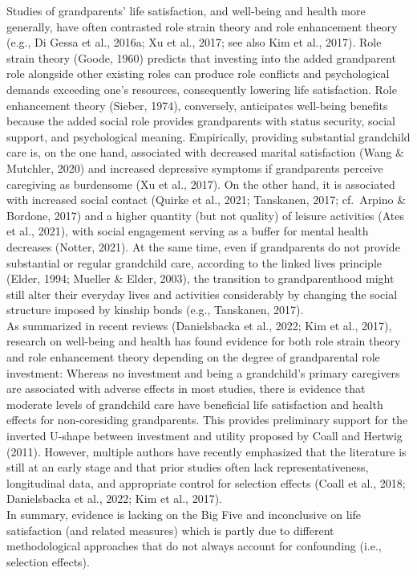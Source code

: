 \documentclass[
  english,
  man,floatsintext]{apa7}
\begin{document}
Studies of grandparents' life satisfaction, and well-being and health more generally, have often contrasted role strain theory and role enhancement theory (e.g., Di Gessa et al., 2016a; Xu et al., 2017; see also Kim et al., 2017). Role strain theory (Goode, 1960) predicts that investing into the added grandparent role alongside other existing roles can produce role conflicts and psychological demands exceeding one's resources, consequently lowering life satisfaction. Role enhancement theory (Sieber, 1974), conversely, anticipates well-being benefits because the added social role provides grandparents with status security, social support, and psychological meaning. Empirically, providing substantial grandchild care is, on the one hand, associated with decreased marital satisfaction (Wang \& Mutchler, 2020) and increased depressive symptoms if grandparents perceive caregiving as burdensome (Xu et al., 2017). On the other hand, it is associated with increased social contact (Quirke et al., 2021; Tanskanen, 2017; cf.~Arpino \& Bordone, 2017) and a higher quantity (but not quality) of leisure activities (Ates et al., 2021), with social engagement serving as a buffer for mental health decreases (Notter, 2021). At the same time, even if grandparents do not provide substantial or regular grandchild care, according to the linked lives principle (Elder, 1994; Mueller \& Elder, 2003), the transition to grandparenthood might still alter their everyday lives and activities considerably by changing the social structure imposed by kinship bonds (e.g., Tanskanen, 2017).\\
As summarized in recent reviews (Danielsbacka et al., 2022; Kim et al., 2017), research on well-being and health has found evidence for both role strain theory and role enhancement theory depending on the degree of grandparental role investment: Whereas no investment and being a grandchild's primary caregivers are associated with adverse effects in most studies, there is evidence that moderate levels of grandchild care have beneficial life satisfaction and health effects for non-coresiding grandparents. This provides preliminary support for the inverted U-shape between investment and utility proposed by Coall and Hertwig (2011). However, multiple authors have recently emphasized that the literature is still at an early stage and that prior studies often lack representativeness, longitudinal data, and appropriate control for selection effects (Coall et al., 2018; Danielsbacka et al., 2022; Kim et al., 2017).\\
In summary, evidence is lacking on the Big Five and inconclusive on life satisfaction (and related measures) which is partly due to different methodological approaches that do not always account for confounding (i.e., selection effects).
\end{document}
